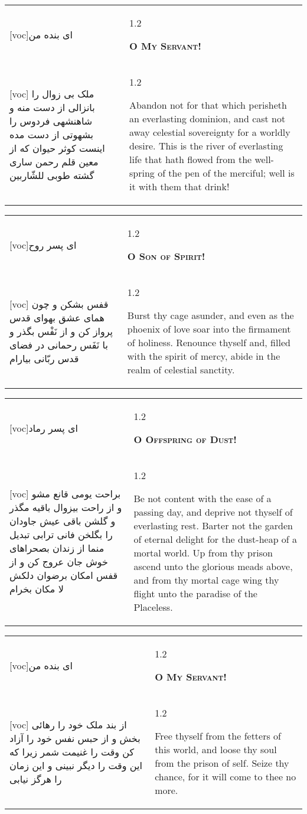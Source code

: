 \documentclass[11pt]{article}
\makeatletter
\newenvironment{orig}
  {\begin{farsi}[voc]}
  {\end{farsi}}
\newenvironment{trans}
  {\Large\begin{spacing}{1.2}\raggedright}
  {\end{spacing}}
\newenvironment{word}
  {\begin{tabular}[t]{p{2.75in}@{\hspace{3em}}p{2.75in}}}
  {\end{tabular}}
\newcommand{\ayat}[2]{\begin{orig}#1\end{orig} & \begin{trans}#2\end{trans}}
\newcommand{\heading}[2]{\textsc{\textbf{#1}} %
}
\makeatother
\begin{document}
\pagebreak

\begin{word}
\ayat{ای بنده من}{\heading{O My Servant!}{}} \\ \ayat{
ملک بی زوال را بانزالی از دست منه و شاهنشهی فردوس را بشهوتی از دست مده اينست کوثر حيوان که از معين قلم رحمن ساری گشته طوبی للشّاربين
}{
  Abandon not for that which perisheth an everlasting dominion, and cast not
  away celestial sovereignty for a worldly desire. This is the river of
  everlasting life that hath flowed from the well-spring of the pen of the
  merciful; well is it with them that drink!
}
\end{word}

\pagebreak

\begin{word}
\ayat{ای پسر روح}{\heading{O Son of Spirit!}{}} \\ \ayat{
قفس بشکن و چون همای عشق بهوای قدس پرواز کن و از نَفْس بگذر و با نَفَس رحمانی در فضای قدس ربّانی بيارام
}{
  Burst thy cage asunder, and even as the phoenix of love soar into the
  firmament of holiness. Renounce thyself and, filled with the spirit of
  mercy, abide in the realm of celestial sanctity.
}
\end{word}

\pagebreak

\begin{word}
\ayat{ای پسر رماد}{\heading{O Offspring of Dust!}{}} \\ \ayat{
براحت يومی قانع مشو و از راحت بيزوال باقيه مگذر و گلشن باقی عيش جاودان را بگلخن فانی ترابی تبديل منما
از زندان بصحراهای خوش جان عروج کن و از قفس امکان برضوان دلکش لا مکان بخرام
}{
  Be not content with the ease of a passing day, and deprive not thyself of
  everlasting rest. Barter not the garden of eternal delight for the dust-heap
  of a mortal world. Up from thy prison ascend unto the glorious meads above,
  and from thy mortal cage wing thy flight unto the paradise of the Placeless.
}
\end{word}

\pagebreak

\begin{word}
\ayat{ای بنده من}{\heading{O My Servant!}{}} \\ \ayat{
از بند ملک خود را رهائی بخش و از حبس نفس خود را آزاد کن وقت را غنيمت شمر زيرا که اين وقت را ديگر نبينی و اين زمان را هرگز نيابی
}{
  Free thyself from the fetters of this world, and loose thy soul from the
  prison of self. Seize thy chance, for it will come to thee no more.
}
\end{word}
\end{document}
